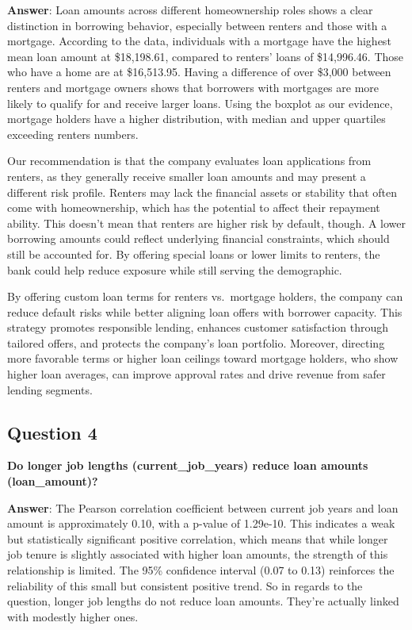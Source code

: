 \documentclass[
]{article}
\begin{document}
\textbf{Answer}: Loan amounts across different homeownership roles shows
a clear distinction in borrowing behavior, especially between renters
and those with a mortgage. According to the data, individuals with a
mortgage have the highest mean loan amount at \$18,198.61, compared to
renters' loans of \$14,996.46. Those who have a home are at \$16,513.95.
Having a difference of over \$3,000 between renters and mortgage owners
shows that borrowers with mortgages are more likely to qualify for and
receive larger loans. Using the boxplot as our evidence, mortgage
holders have a higher distribution, with median and upper quartiles
exceeding renters numbers.

Our recommendation is that the company evaluates loan applications from
renters, as they generally receive smaller loan amounts and may present
a different risk profile. Renters may lack the financial assets or
stability that often come with homeownership, which has the potential to
affect their repayment ability. This doesn't mean that renters are
higher risk by default, though. A lower borrowing amounts could reflect
underlying financial constraints, which should still be accounted for.
By offering special loans or lower limits to renters, the bank could
help reduce exposure while still serving the demographic.

By offering custom loan terms for renters vs.~mortgage holders, the
company can reduce default risks while better aligning loan offers with
borrower capacity. This strategy promotes responsible lending, enhances
customer satisfaction through tailored offers, and protects the
company's loan portfolio. Moreover, directing more favorable terms or
higher loan ceilings toward mortgage holders, who show higher loan
averages, can improve approval rates and drive revenue from safer
lending segments.

\subsection{Question 4}\label{question-4}

\textbf{Do longer job lengths (current\_job\_years) reduce loan amounts
(loan\_amount)?}

\textbf{Answer}: The Pearson correlation coefficient between current job
years and loan amount is approximately 0.10, with a p-value of 1.29e-10.
This indicates a weak but statistically significant positive
correlation, which means that while longer job tenure is slightly
associated with higher loan amounts, the strength of this relationship
is limited. The 95\% confidence interval (0.07 to 0.13) reinforces the
reliability of this small but consistent positive trend. So in regards
to the question, longer job lengths do not reduce loan amounts. They're
actually linked with modestly higher ones.
\end{document}

